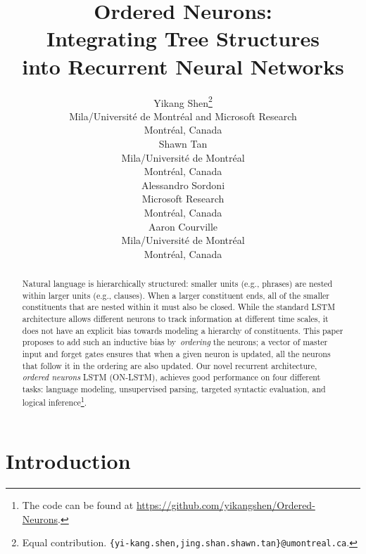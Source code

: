 \documentclass{article} \usepackage{iclr2019_conference,times}
\title{Ordered Neurons: \\ Integrating Tree Structures \\ into Recurrent Neural Networks}
\author{Yikang Shen\thanks{Equal contribution. \texttt{\{yi-kang.shen,jing.shan.shawn.tan\}@umontreal.ca}.}\\
Mila/Universit\'e de Montr\'eal and Microsoft Research \\
Montr\'eal, Canada \\
\And
Shawn Tan\\
Mila/Universit\'e de Montr\'eal \\
Montr\'eal, Canada \\
\AND
Alessandro Sordoni \\
Microsoft Research \\
Montr\'eal, Canada \\
\And
Aaron Courville \\
Mila/Universit\'e de Montr\'eal \\
Montr\'eal, Canada \\
}
\begin{document}
\maketitle

\begin{abstract}
Natural language is hierarchically structured: smaller units (e.g., phrases) are nested within larger units (e.g., clauses). When a larger constituent ends, all of the smaller constituents that are nested within it must also be closed. While the standard LSTM architecture allows different neurons to track information at different time scales, it does not have an explicit bias towards modeling a hierarchy of constituents. This paper proposes to add such an inductive bias by~\emph{ordering} the neurons; a vector of master input and forget gates ensures that when a given neuron is updated, all the neurons that follow it in the ordering are also updated. Our novel recurrent architecture, \emph{ordered neurons} LSTM (ON-LSTM), achieves good performance on four different tasks: language modeling, unsupervised parsing, targeted syntactic evaluation, and logical inference\footnote{The code can be found at \url{https://github.com/yikangshen/Ordered-Neurons}.}.
\end{abstract}

\section{Introduction}
\end{document}
